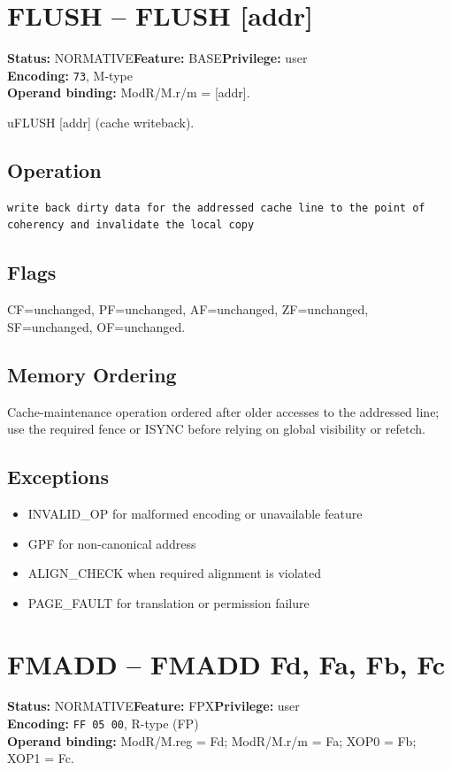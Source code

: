 \documentclass[10pt]{article}
\begin{document}
\section{FLUSH -- FLUSH [addr]}
\textbf{Status:} NORMATIVE\quad \textbf{Feature:} BASE\quad \textbf{Privilege:} user\\
\textbf{Encoding:} \texttt{73}, M-type\\
\textbf{Operand binding:} ModR/M.r/m = [addr].

uFLUSH [addr] (cache writeback).

\subsection*{Operation}
\begin{lstlisting}
write back dirty data for the addressed cache line to the point of coherency and invalidate the local copy
\end{lstlisting}
\subsection*{Flags}
CF=unchanged, PF=unchanged, AF=unchanged, ZF=unchanged, SF=unchanged, OF=unchanged.
\subsection*{Memory Ordering}
Cache-maintenance operation ordered after older accesses to the addressed line; use the required fence or ISYNC before relying on global visibility or refetch.
\subsection*{Exceptions}
\begin{itemize}
\item INVALID\_OP for malformed encoding or unavailable feature
\item GPF for non-canonical address
\item ALIGN\_CHECK when required alignment is violated
\item PAGE\_FAULT for translation or permission failure
\end{itemize}
\clearpage

\section{FMADD -- FMADD Fd, Fa, Fb, Fc}
\textbf{Status:} NORMATIVE\quad \textbf{Feature:} FPX\quad \textbf{Privilege:} user\\
\textbf{Encoding:} \texttt{FF 05 00}, R-type (FP)\\
\textbf{Operand binding:} ModR/M.reg = Fd; ModR/M.r/m = Fa; XOP0 = Fb; XOP1 = Fc.
\end{document}
